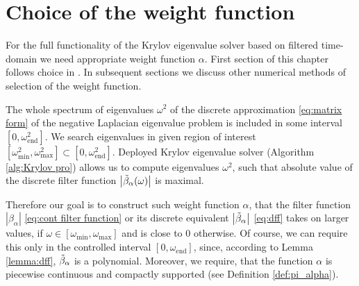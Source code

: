 \documentclass[a4paper,11pt,bibliography=totoc,listof=totoc,headinclude=true,cleardoublepage=empty,oneside]{scrbook}
\newcommand{\dff}{\Tilde{\beta}_\alpha}
\newcommand{\e}{\mathrm{end}}
\begin{document}
\chapter{Choice of the weight function}
\label{chapter:function}
For the full functionality of the Krylov eigenvalue solver based on filtered time-domain we need appropriate weight function $\alpha$. First section of this chapter follows choice in \cite{nannen}. In subsequent sections we discuss other numerical methods of selection of the weight function.

The whole spectrum of eigenvalues $\omega^2$ of the discrete approximation \eqref{eq:matrix form} of the negative Laplacian eigenvalue problem is included in some interval $\left[0, \omega_\e^2\right]$. We search eigenvalues in given region of interest $\left[\omega_{\min}^2, \omega_{\max}^2\right] \subset \left[0, \omega_\e^2\right]$. Deployed Krylov eigenvalue solver (Algorithm \ref{alg:Krylov pro}) allows us to compute eigenvalues $\omega^2$, such that absolute value of the discrete filter function $\left|\dff(\omega)\right|$ is maximal. 

Therefore our goal is to construct such weight function $\alpha$, that the filter function $\left|\beta_\alpha\right|$ \eqref{eq:cont filter function} or its discrete equivalent $\left|\dff\right|$ \eqref{eq:dff} takes on larger values, if $\omega \in \left[\omega_{\min}, \omega_{\max} \right]$ and is close to 0 otherwise. Of course, we can require this only in the controlled interval $\left[0, \omega_\e\right]$, since, according to Lemma \ref{lemma:dff}, $\dff$ is a polynomial. Moreover, we require, that the function $\alpha$ is piecewise continuous and compactly supported (see Definition \ref{def:pi_alpha}).
\end{document}
